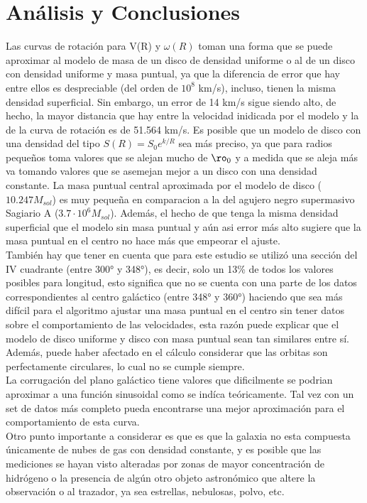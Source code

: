 \documentclass[letterpaper,oneside]{article}
\begin{document}
\section{Análisis y Conclusiones}
Las curvas de rotación para V(R) y $\omega(R)$ toman una forma que se puede aproximar al modelo de masa de un disco de densidad uniforme o al de un disco con densidad uniforme y masa puntual, ya que la diferencia de error que hay entre ellos es despreciable (del orden de $10^{8}$ km/s), incluso, tienen la misma densidad superficial. Sin embargo, un error de 14 km/s sigue siendo alto, de hecho, la mayor distancia que hay entre la velocidad inidicada por el modelo y la de la curva de rotación es de 51.564 km/s. Es posible que un modelo de disco con una densidad del tipo $S(R) = S_0e^{k/R}$ sea más preciso, ya que para radios pequeños toma valores que se alejan mucho de $\ro_0$ y a medida que se aleja más va tomando valores que se asemejan mejor a un disco con una densidad constante. La masa puntual central aproximada por el modelo de disco ($10.247 M_{sol}$) es muy pequeña en comparacion a la del agujero negro supermasivo Sagiario A ($3.7 \cdot 10^{6} M_{sol}$). Además, el hecho de que tenga la misma densidad superficial que el modelo sin masa puntual y aún asi error más alto sugiere que la masa puntual en el centro no hace más que empeorar el ajuste.\\

También hay que tener en cuenta que para este estudio se utilizó una sección del \textrm{IV} cuadrante (entre 300° y 348°), es decir, solo un 13\% de todos los valores posibles para longitud, esto significa que no se cuenta con una parte de los datos correspondientes al centro galáctico (entre 348° y 360°) haciendo que sea más difícil para el algoritmo ajustar una masa puntual en el centro sin tener datos sobre el comportamiento de las velocidades, esta  razón puede explicar que el modelo de disco uniforme y disco con masa puntual sean tan similares entre sí. Además, puede haber afectado en el cálculo considerar que las orbitas son perfectamente circulares, lo cual no se cumple siempre.\\

La corrugación del plano galáctico tiene valores que dificilmente se podrian aproximar a una función sinusoidal como se indíca teóricamente. Tal vez con un set de datos más completo pueda encontrarse una mejor aproximación para el comportamiento de esta curva.\\

Otro punto importante a considerar es que es que la galaxia no esta compuesta únicamente de nubes de gas con densidad constante, y es posible que las mediciones se hayan visto alteradas por zonas de mayor concentración de hidrógeno o la presencia de algún otro objeto astronómico que altere la observación o al trazador, ya sea estrellas, nebulosas, polvo, etc.\\
\end{document}

